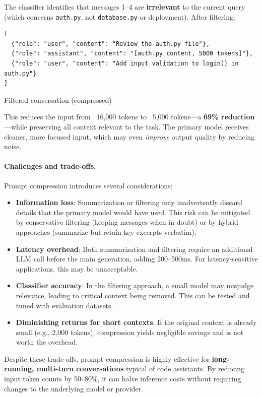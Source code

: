 \documentclass[english]{article}
\begin{document}
The classifier identifies that messages 1--4 are \textbf{irrelevant} to the current query (which concerns \texttt{auth.py}, not \texttt{database.py} or deployment). After filtering:

\begin{listing}[H]
\begin{verbatim}
[
  {"role": "user", "content": "Review the auth.py file"},
  {"role": "assistant", "content": "[auth.py content, 5000 tokens]"},
  {"role": "user", "content": "Add input validation to login() in auth.py"}
]
\end{verbatim}
\caption{Filtered conversation (compressed)}
\end{listing}

This reduces the input from ~16,000 tokens to ~5,000 tokens—a \textbf{69\% reduction}—while preserving all context relevant to the task. The primary model receives cleaner, more focused input, which may even \emph{improve} output quality by reducing noise.

\paragraph{Challenges and trade-offs.}

Prompt compression introduces several considerations:
\begin{itemize}
    \item \textbf{Information loss}: Summarization or filtering may inadvertently discard details that the primary model would have used. This risk can be mitigated by conservative filtering (keeping messages when in doubt) or by hybrid approaches (summarize but retain key excerpts verbatim).
    \item \textbf{Latency overhead}: Both summarization and filtering require an additional LLM call before the main generation, adding 200--500ms. For latency-sensitive applications, this may be unacceptable.
    \item \textbf{Classifier accuracy}: In the filtering approach, a small model may misjudge relevance, leading to critical context being removed. This can be tested and tuned with evaluation datasets.
    \item \textbf{Diminishing returns for short contexts}: If the original context is already small (e.g., 2,000 tokens), compression yields negligible savings and is not worth the overhead.
\end{itemize}

Despite these trade-offs, prompt compression is highly effective for \textbf{long-running, multi-turn conversations} typical of code assistants. By reducing input token counts by 50--80\%, it can halve inference costs without requiring changes to the underlying model or provider.
\end{document}

